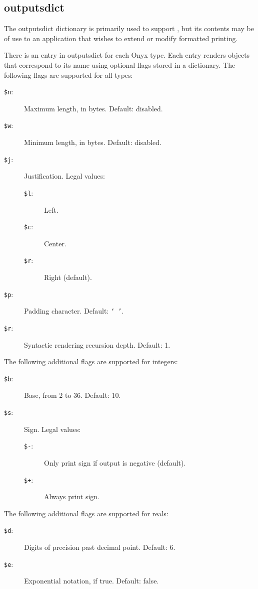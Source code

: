 \subsection{outputsdict}
\label{sec:outputsdict}

The outputsdict dictionary is primarily used to support
, but its contents may be of
use to an application that wishes to extend or modify formatted printing.

There is an entry in outputsdict for each Onyx type.  Each entry renders objects
that correspond to its name using optional flags stored in a dictionary.  The
following flags are supported for all types:
\begin{description}
\item[{\tt \$n}: ]
	Maximum length, in bytes.  Default: disabled.
\item[{\tt \$w}: ]
	Minimum length, in bytes.  Default: disabled.
\item[{\tt \$j}: ]
	Justification.  Legal values:
	\begin{description}
	\item[{\tt \$l}: ]
		Left.
	\item[{\tt \$c}: ]
		Center.
	\item[{\tt \$r}: ]
		Right (default).
	\end{description}
\item[{\tt \$p}: ]
	Padding character.  Default: {\tt ` '}.
\item[{\tt \$r}: ]
	Syntactic rendering recursion depth.  Default: 1.
\end{description}

The following additional flags are supported for integers:
\begin{description}
\item[{\tt \$b}: ]
	Base, from 2 to 36.  Default: 10.
\item[{\tt \$s}: ]
	Sign.  Legal values:
	\begin{description}
	\item[{\tt \$-}: ]
		Only print sign if output is negative (default).
	\item[{\tt \$+}: ]
		Always print sign.
	\end{description}
\end{description}

The following additional flags are supported for reals:
\begin{description}
\item[{\tt \$d}: ]
	Digits of precision past decimal point.  Default: 6.
\item[{\tt \$e}: ]
	Exponential notation, if true.  Default: false.
\end{description}


